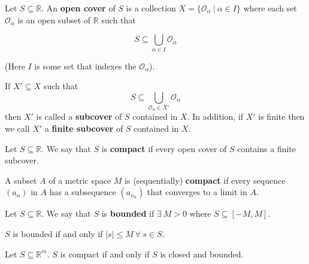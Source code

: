 \begin{definition} Let \(S \subseteq \mathbb{R}\). An \textbf{open cover} of \(S\) is a collection \(X = \{\mathcal{O}_\alpha \ | \ \alpha \in I \} \) where each set \(\mathcal{O}_\alpha\) is an open subset of \(\mathbb{R}\) such that

\[
S \subseteq \bigcup_{\alpha \in I} \mathcal{O}_\alpha
\]

(Here \(I\) is some set that indexes the \(\mathcal{O}_\alpha\)).

\end{definition}

\begin{definition} If \(X' \subseteq X\) such that \[S \subseteq  \bigcup_{\mathcal{O}_\alpha \in X'} \mathcal{O}_\alpha\]then \(X'\) is called a \textbf{subcover} of \(S\) contained in \(X\). In addition, if \(X'\) is finite then we call \(X'\) a \textbf{finite subcover} of \(S\) contained in \(X\).

\end{definition}

\begin{definition} Let \(S \subseteq \mathbb{R}\). We say that \(S\) is \textbf{compact} if every open cover of \(S\) contains a finite subcover. 

\end{definition}

\begin{definition}\label{ra.def.compactness} A subset \(A\) of a metric space \(M\) is (sequentially) \textbf{compact} if every sequence \((a_n)\) in \(A\) has a subsequence \((a_{n_k})\) that converges to a limit in \(A\).

\end{definition}

\begin{definition} Let \(S \subseteq \mathbb{R}\). We say that \(S\) is \textbf{bounded} if \(\exists \ M > 0\) where \(S \subseteq [-M, M]\).

\end{definition}

\begin{remark} \(S\) is bounded if and only if \(|s| \leq M\  \forall \ s \in S \).

\end{remark}

\begin{theorem} \label{ra.heine-borel.thm}  Let \(S \subseteq \mathbb{R}^m\). \(S\) is compact if and only if \(S\) is closed and bounded.

\end{theorem}

